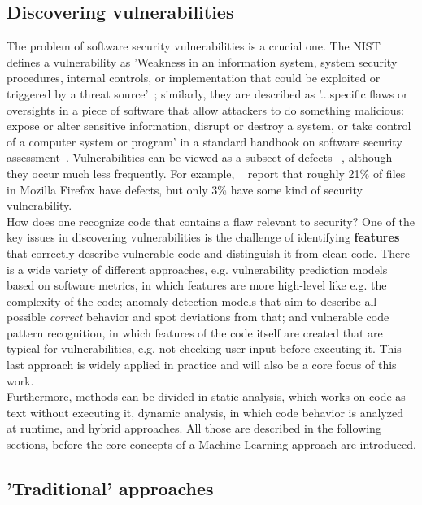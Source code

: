 \documentclass[
	a4paper,
	pagesize,
	pdftex,
	12pt,
	twoside, %
	BCOR=5mm, %
	ngerman,
	fleqn,
	final,
	]{scrartcl}
\begin{document}
\subsection{Discovering vulnerabilities}

The problem of software security vulnerabilities is a crucial one. The NIST defines a vulnerability as 'Weakness in an information system, system security procedures, internal controls, or implementation that could be exploited or triggered by a threat source'~\cite{NISTComputerSecurityRessourceCenter.}; similarly, they are described as '...specific flaws or oversights in a piece of software that allow attackers to do something malicious: expose or alter sensitive information, disrupt or destroy a system, or take control of a computer system or program' in a standard handbook on software security assessment~\cite{Dowd.2006}.
Vulnerabilities can be viewed as a subsect of defects ~\cite{Morrison.2015}, although they occur much less frequently. For example, ~\cite{Shin.2013} report that roughly 21\% of files in Mozilla Firefox have defects, but only 3\% have some kind of security vulnerability. \\
How does one recognize code that contains a flaw relevant to security? One of the key issues in discovering vulnerabilities is the challenge of identifying \textbf{features} that correctly describe vulnerable code and distinguish it from clean code. There is a wide variety of different approaches\citep{Ghaffarian.2017}, e.g. vulnerability prediction models based on software metrics, in which features are more high-level like e.g. the complexity of the code; anomaly detection models that aim to describe all possible \textit{correct} behavior and spot deviations from that; and vulnerable code pattern recognition, in which features of the code itself are created that are typical for vulnerabilities, e.g. not checking user input before executing it. This last approach is widely applied in practice and will also be a core focus of this work.\\
Furthermore, methods can be divided in static analysis, which works on code as text without executing it, dynamic analysis, in which code behavior is analyzed at runtime, and hybrid approaches. All those are described in the following sections, before the core concepts of a Machine Learning approach are introduced.
\subsection{'Traditional' approaches}
\end{document}
